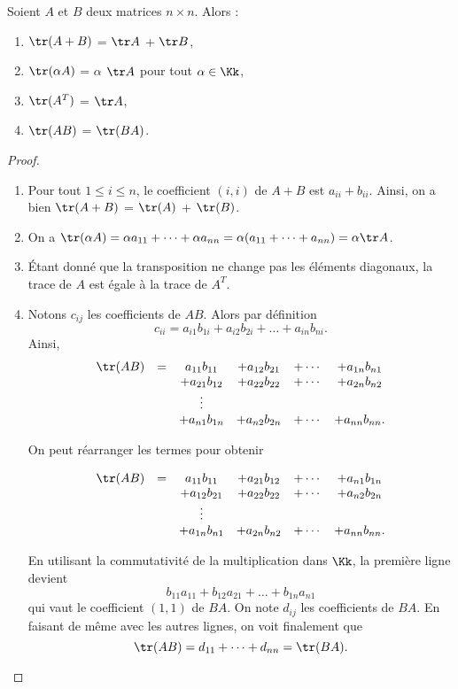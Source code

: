 \documentclass[class=report,crop=false]{standalone}
\begin{document}
\begin{theoreme}
Soient $A$ et $B$ deux matrices $n \times n$. Alors :
\begin{enumerate}
\item $\tr(A + B)$ = $\tr A$ + $\tr B$,
\item $\tr(\alpha A)$ = $\alpha$ $\tr A$ pour tout $\alpha \in \Kk$,
\item $\tr(A^T)$ = $\tr A $,
\item $\tr(AB)$ = $\tr(BA)$.
\end{enumerate}
\end{theoreme}


\begin{proof}
~
\begin{enumerate}
\item Pour tout $1 \leq i \leq n$, le coefficient $(i,i)$ de $A+B$ est $a_{ii} + b_{ii}$.
Ainsi, on a bien $\tr(A + B)$ = $\tr(A)$ + $\tr(B)$.

\item On a $\tr(\alpha A) = \alpha a_{11} +\dots+ \alpha a_{nn}
= \alpha (a_{11} +\dots+ a_{nn})= \alpha \tr A$.

\item \'Etant donné que la transposition ne change pas les éléments diagonaux,
la trace de $A$ est égale à la trace de $A^T$.

\item Notons $c_{ij}$ les coefficients de $AB$.
Alors par définition
$$c_{ii} = a_{i1}b_{1i} + a_{i2}b_{2i} +\dots+ a_{in}b_{ni}.$$
Ainsi,
$$\begin{array}{cccccc}
\tr(AB) & = & a_{11}b_{11} & + a_{12}b_{21} & +\cdots &+ a_{1n}b_{n1}\\
 & &+ a_{21}b_{12} & + a_{22}b_{22}& +\cdots & + a_{2n}b_{n2}\\
& & \vdots &&&\\
& & +a_{n1}b_{1n} & + a_{n2}b_{2n}& +\cdots & + a_{nn}b_{nn}.
\end{array}$$

On peut réarranger les termes pour obtenir

$$\begin{array}{cccccc}
\tr(AB) &=& a_{11}b_{11} & + a_{21}b_{12} & +\cdots &+ a_{n1}b_{1n}\\
&&+  a_{12}b_{21} & + a_{22}b_{22}& +\cdots & + a_{n2}b_{2n}\\
 && \vdots &&\\
 &&+ a_{1n}b_{n1} & + a_{2n}b_{n2}& +\cdots & + a_{nn}b_{nn}.
\end{array}$$

En utilisant la commutativité de la multiplication dans $\Kk$, la première ligne devient
$$b_{11}a_{11} + b_{12}a_{21} +\dots+ b_{1n}a_{n1}$$
qui vaut le coefficient $(1,1)$ de $BA$. On note $d_{ij}$ les coefficients de $BA$.
En faisant de même avec les
autres lignes, on voit finalement que
$$\tr(AB) = d_{11} +\dots+ d_{nn} = \tr(BA).$$
\end{enumerate}
\end{proof}
\end{document}

